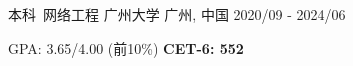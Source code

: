 

\begin{cventries}

  \cventry
    {本科\ 网络工程} %
    {广州大学} %
    {广州, 中国} %
    {2020/09 - 2024/06} %
    {
      \begin{cvitems} %
        \item {GPA: 3.65/4.00 (前10\%) \hspace{1mm} \textbf{CET-6: 552}}
      \end{cvitems}
    }

\end{cventries}
